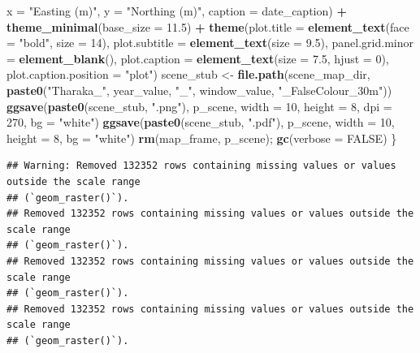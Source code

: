 \documentclass[
]{article}
\newenvironment{Shaded}{\begin{snugshade}}{\end{snugshade}}
\newcommand{\AttributeTok}[1]{\textcolor[rgb]{0.13,0.29,0.53}{#1}}
\newcommand{\ConstantTok}[1]{\textcolor[rgb]{0.56,0.35,0.01}{#1}}
\newcommand{\DecValTok}[1]{\textcolor[rgb]{0.00,0.00,0.81}{#1}}
\newcommand{\FloatTok}[1]{\textcolor[rgb]{0.00,0.00,0.81}{#1}}
\newcommand{\FunctionTok}[1]{\textcolor[rgb]{0.13,0.29,0.53}{\textbf{#1}}}
\newcommand{\NormalTok}[1]{#1}
\newcommand{\OtherTok}[1]{\textcolor[rgb]{0.56,0.35,0.01}{#1}}
\newcommand{\SpecialCharTok}[1]{\textcolor[rgb]{0.81,0.36,0.00}{\textbf{#1}}}
\newcommand{\StringTok}[1]{\textcolor[rgb]{0.31,0.60,0.02}{#1}}
\begin{document}
\begin{Shaded}
\begin{Highlighting}[]
         \AttributeTok{x =} \StringTok{"Easting (m)"}\NormalTok{, }\AttributeTok{y =} \StringTok{"Northing (m)"}\NormalTok{, }\AttributeTok{caption =}\NormalTok{ date\_caption) }\SpecialCharTok{+}
    \FunctionTok{theme\_minimal}\NormalTok{(}\AttributeTok{base\_size =} \FloatTok{11.5}\NormalTok{) }\SpecialCharTok{+}
    \FunctionTok{theme}\NormalTok{(}\AttributeTok{plot.title =} \FunctionTok{element\_text}\NormalTok{(}\AttributeTok{face =} \StringTok{"bold"}\NormalTok{, }\AttributeTok{size =} \DecValTok{14}\NormalTok{),}
          \AttributeTok{plot.subtitle =} \FunctionTok{element\_text}\NormalTok{(}\AttributeTok{size =} \FloatTok{9.5}\NormalTok{), }\AttributeTok{panel.grid.minor =} \FunctionTok{element\_blank}\NormalTok{(),}
          \AttributeTok{plot.caption =} \FunctionTok{element\_text}\NormalTok{(}\AttributeTok{size =} \FloatTok{7.5}\NormalTok{, }\AttributeTok{hjust =} \DecValTok{0}\NormalTok{), }\AttributeTok{plot.caption.position =} \StringTok{"plot"}\NormalTok{)}
\NormalTok{  scene\_stub }\OtherTok{\textless{}{-}} \FunctionTok{file.path}\NormalTok{(scene\_map\_dir, }\FunctionTok{paste0}\NormalTok{(}\StringTok{"Tharaka\_"}\NormalTok{, year\_value, }\StringTok{"\_"}\NormalTok{, window\_value, }\StringTok{"\_FalseColour\_30m"}\NormalTok{))}
  \FunctionTok{ggsave}\NormalTok{(}\FunctionTok{paste0}\NormalTok{(scene\_stub, }\StringTok{".png"}\NormalTok{), p\_scene, }\AttributeTok{width =} \DecValTok{10}\NormalTok{, }\AttributeTok{height =} \DecValTok{8}\NormalTok{, }\AttributeTok{dpi =} \DecValTok{270}\NormalTok{, }\AttributeTok{bg =} \StringTok{"white"}\NormalTok{)}
  \FunctionTok{ggsave}\NormalTok{(}\FunctionTok{paste0}\NormalTok{(scene\_stub, }\StringTok{".pdf"}\NormalTok{), p\_scene, }\AttributeTok{width =} \DecValTok{10}\NormalTok{, }\AttributeTok{height =} \DecValTok{8}\NormalTok{, }\AttributeTok{bg =} \StringTok{"white"}\NormalTok{)}
  \FunctionTok{rm}\NormalTok{(map\_frame, p\_scene); }\FunctionTok{gc}\NormalTok{(}\AttributeTok{verbose =} \ConstantTok{FALSE}\NormalTok{)}
\NormalTok{\}}
\end{Highlighting}
\end{Shaded}

\begin{verbatim}
## Warning: Removed 132352 rows containing missing values or values outside the scale range
## (`geom_raster()`).
## Removed 132352 rows containing missing values or values outside the scale range
## (`geom_raster()`).
## Removed 132352 rows containing missing values or values outside the scale range
## (`geom_raster()`).
## Removed 132352 rows containing missing values or values outside the scale range
## (`geom_raster()`).
\end{verbatim}
\end{document}
